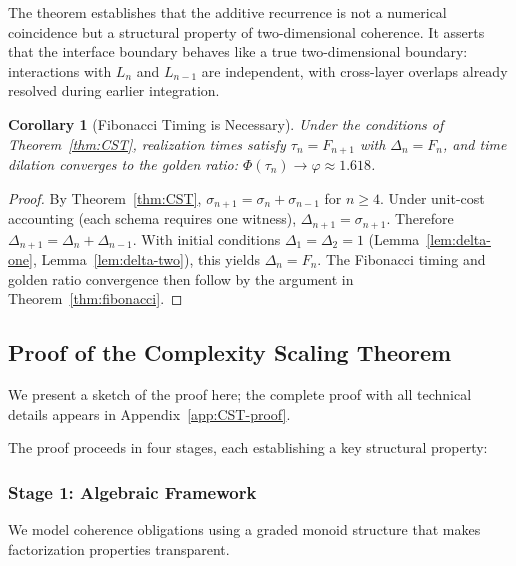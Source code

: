 \documentclass[11pt]{article}
\newtheorem{corollary}[theorem]{Corollary}
\theoremstyle{definition}
\theoremstyle{remark}
\begin{document}
The theorem establishes that the additive recurrence is not a numerical coincidence but a structural
property of two-dimensional coherence. It asserts that the interface boundary behaves like a true
two-dimensional boundary: interactions with $L_n$ and $L_{n-1}$ are independent, with cross-layer
overlaps already resolved during earlier integration.

\begin{corollary}[Fibonacci Timing is Necessary]
\label{cor:fibonacci-necessary}
Under the conditions of Theorem~\ref{thm:CST}, realization times satisfy $\tau_n = F_{n+1}$ with
$\Delta_n = F_n$, and time dilation converges to the golden ratio: $\Phi(\tau_n) \to \varphi \approx 1.618$.
\end{corollary}

\begin{proof}
By Theorem~\ref{thm:CST}, $\sigma_{n+1} = \sigma_n + \sigma_{n-1}$ for $n \geq 4$. Under unit-cost accounting
(each schema requires one witness), $\Delta_{n+1} = \sigma_{n+1}$. Therefore $\Delta_{n+1} = \Delta_n + \Delta_{n-1}$.
With initial conditions $\Delta_1 = \Delta_2 = 1$ (Lemma~\ref{lem:delta-one}, Lemma~\ref{lem:delta-two}), this yields $\Delta_n = F_n$.
The Fibonacci timing and golden ratio convergence then follow by the argument in
Theorem~\ref{thm:fibonacci}.
\end{proof}

\subsection{Proof of the Complexity Scaling Theorem}

We present a sketch of the proof here; the complete proof with all technical details appears in
Appendix~\ref{app:CST-proof}.

The proof proceeds in four stages, each establishing a key structural property:

\subsubsection{Stage 1: Algebraic Framework}

We model coherence obligations using a graded monoid structure that makes factorization properties
transparent.
\end{document}
